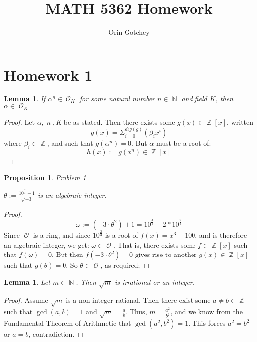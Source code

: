 \documentclass{article}
\newtheorem{lemma}[theorem]{Lemma}
\newtheorem{proposition}[theorem]{Proposition}
\DeclareMathOperator{\Z}{\mathbb{Z}}
\DeclareMathOperator{\N}{\mathbb{N}}
\DeclareMathOperator{\scrO}{\mathscr{O}}
\begin{document}
\title{MATH 5362 Homework}
\author{Orin Gotchey}
\maketitle
\section{Homework 1}
\begin{lemma}
If $\alpha^n\in\scrO_{K}$ for some natural number $n\in\N$ and field $K$, then $\alpha\in\scrO_{K}$
\end{lemma}
\begin{proof}
Let $\alpha,\;n\;,K$ be as stated.  Then there exists some $g(x)\in\Z[x]$, written
\begin{equation}
g(x) = \Sigma_{i=0}^{deg(g)}(\beta_ix^i)
\end{equation}
where $\beta_i\in\Z$, and such that $g(\alpha^n)=0$.  But $\alpha$ must be a root of:
\begin{equation}
h(x) := g(x^n) \in\Z[x]
\end{equation}
\end{proof}
\begin{proposition}{Problem 1}

$\theta := \frac{10^{\frac{2}{3}}-1}{\sqrt{-3}}$ is an algebraic integer.
\end{proposition}
\begin{proof}
\begin{equation}
\omega := (-3\cdot\theta^2)+1 = 10^{\frac{4}{3}} - 2*10^{\frac{2}{3}}
\end{equation}
Since $\scrO$ is a ring, and since $10^{\frac{2}{3}}$ is a root of $f(x) = x^3-100$, and is therefore an algebraic integer, we get: $\omega\in\scrO$.  That is, there exists some $f\in\Z[x]$ such that $f(\omega)=0$.  But then $f(-3\cdot\theta^2)=0$ gives rise to another $g(x)\in\Z[x]$ such that $g(\theta)=0$.  So $\theta\in\scrO$, as required;
\end{proof}
\begin{lemma}
	Let $m\in\N$.  Then $\sqrt{m}$ is irrational or an integer.
\end{lemma}
\begin{proof}
	Assume $\sqrt{m}$ is a non-integer rational.  Then there exist some $a
	\neq{}b\in\Z$ such that $\gcd(a,b)=1$ and $\sqrt{m}=\frac{a}{b}$.  Thus, $m = \frac{a^2}{b^2}$, and we know from the Fundamental Theorem of Arithmetic that $\gcd(a^2,b^2) = 1$.  This forces $a^2=b^2$ or $a=b$, contradiction.
\end{proof}
\end{document}
